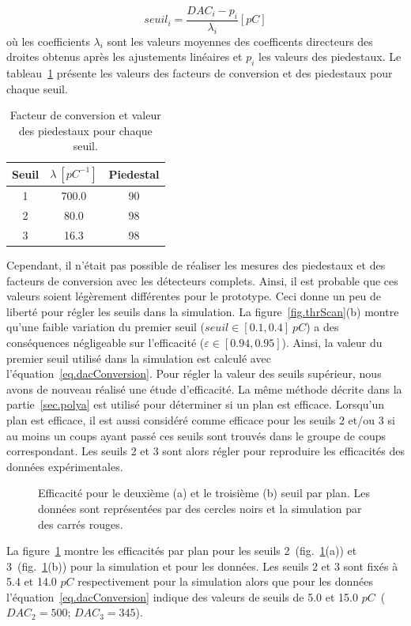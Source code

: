 \begin{equation}
  seuil_i = \frac{DAC_i-p_i}{\lambda_i} [pC]
  \label{eq.dacConversion}
\end{equation}
où les coefficients $\lambda_i$ sont les valeurs moyennes des coefficents directeurs des droites obtenus après les ajustements linéaires et $p_i$ les valeurs des piedestaux.
Le tableau~\ref{tab.lambdas} présente les valeurs des facteurs de conversion et des piedestaux pour chaque seuil.
\begin{table}[!ht]
  \begin{center}
    \begin{tabular}{c|c|c}
      Seuil & $\lambda~[pC^{-1}]$ & Piedestal\\
      \hline
      1 & 700.0 & 90\\
      2 & 80.0 & 98\\
      3 & 16.3 & 98
    \end{tabular}
  \end{center}  
  \caption{Facteur de conversion et valeur des piedestaux pour chaque seuil.}
  \label{tab.lambdas}
\end{table}
Cependant, il n'était pas possible de réaliser les mesures des piedestaux et des facteurs de conversion avec les détecteurs complets. Ainsi, il est probable que ces valeurs soient légèrement différentes pour le prototype. Ceci donne un peu de liberté pour régler les seuils dans la simulation. La figure~\ref{fig.thrScan}(b) montre qu'une faible variation du premier seuil ($seuil\in[0.1,0.4]~pC$) a des conséquences négligeable sur l'efficacité ($\varepsilon\in[0.94,0.95]$). Ainsi, la valeur du premier seuil utilisé dans la simulation est calculé avec l'équation~\ref{eq.dacConversion}. Pour régler la valeur des seuils supérieur, nous avons de nouveau réalisé une étude d'efficacité. La même méthode décrite dans la partie~\ref{sec.polya} est utilisé pour déterminer si un plan est efficace. Lorsqu'un plan est efficace, il est aussi considéré comme efficace pour les seuils 2 et/ou 3 si au moins un coups ayant passé ces seuils sont trouvés dans le groupe de coups correspondant. Les seuils 2 et 3 sont alors régler pour reproduire les efficacités des données expérimentales. 
\begin{figure}[!ht]
  \caption{Efficacité pour le deuxième (a) et le troisième (b) seuil par plan. Les données sont représentées par des cercles noirs et la simulation par des carrés rouges.\label{fig.eff_thr}}
\end{figure}
La figure~\ref{fig.eff_thr} montre les efficacités par plan pour les seuils 2~(fig.~\ref{fig.eff_thr}(a)) et 3~(fig.~\ref{fig.eff_thr}(b)) pour la simulation et pour les données. Les seuils 2 et 3 sont fixés à 5.4 et 14.0 $pC$ respectivement pour la simulation alors que pour les données l'équation~\ref{eq.dacConversion} indique des valeurs de seuils de 5.0 et 15.0 $pC$~($DAC_2=500$; $DAC_3=345$).


